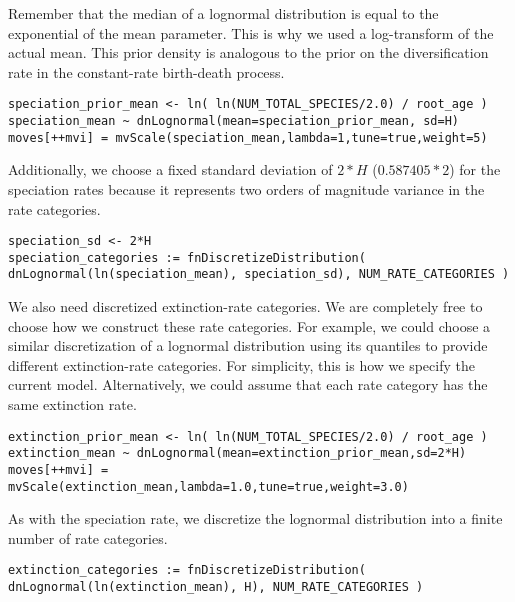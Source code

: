 Remember that the median of a lognormal distribution is equal to the exponential of the mean parameter.
This is why we used a log-transform of the actual mean.
This prior density is analogous to the prior on the diversification rate in the constant-rate birth-death process.
{\tt \begin{snugshade*}
\begin{lstlisting}
speciation_prior_mean <- ln( ln(NUM_TOTAL_SPECIES/2.0) / root_age )
speciation_mean ~ dnLognormal(mean=speciation_prior_mean, sd=H)
moves[++mvi] = mvScale(speciation_mean,lambda=1,tune=true,weight=5)
\end{lstlisting}
\end{snugshade*}}
Additionally, we choose a fixed standard deviation of $2*H$ ($0.587405*2$) for the speciation rates because it represents two orders of magnitude variance in the rate categories.
{\tt \begin{snugshade*}
\begin{lstlisting}
speciation_sd <- 2*H
speciation_categories := fnDiscretizeDistribution( dnLognormal(ln(speciation_mean), speciation_sd), NUM_RATE_CATEGORIES )
\end{lstlisting}
\end{snugshade*}}

We also need discretized extinction-rate categories.
We are completely free to choose how we construct these rate categories.
For example, we could choose a similar discretization of a lognormal distribution using its quantiles to provide different extinction-rate categories.
For simplicity, this is how we specify the current model.
Alternatively, we could assume that each rate category has the same extinction rate.

{\tt \begin{snugshade*}
\begin{lstlisting}
extinction_prior_mean <- ln( ln(NUM_TOTAL_SPECIES/2.0) / root_age )
extinction_mean ~ dnLognormal(mean=extinction_prior_mean,sd=2*H)
moves[++mvi] = mvScale(extinction_mean,lambda=1.0,tune=true,weight=3.0)
\end{lstlisting}
\end{snugshade*}}
As with the speciation rate, we discretize the lognormal distribution into a finite number of rate categories.
{\tt \begin{snugshade*}
\begin{lstlisting}
extinction_categories := fnDiscretizeDistribution( dnLognormal(ln(extinction_mean), H), NUM_RATE_CATEGORIES )
\end{lstlisting}
\end{snugshade*}}

